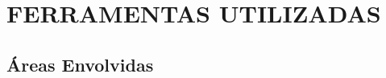 
\chapter{FERRAMENTAS UTILIZADAS}
\label{chap:ferramentas_utilizadas}








\section{Áreas Envolvidas}
\label{sec:areas_envolvidas}